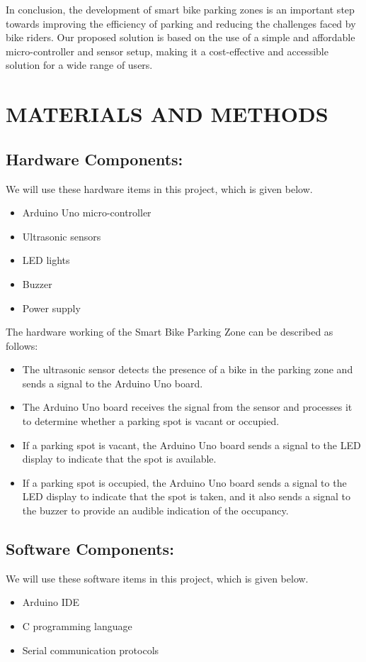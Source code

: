 \documentclass[conference]{IEEEtran}
\begin{document}
	In conclusion, the development of smart bike parking zones is an important step towards improving the efficiency of parking and reducing the challenges faced by bike riders. Our proposed solution is based on the use of a simple and affordable micro-controller and sensor setup, making it a cost-effective and accessible solution for a wide range of users.
	
	\section{MATERIALS AND METHODS}
	

	\subsection{Hardware Components:}
	 We will use these hardware items in this project, which is given below.
	
	\begin{itemize}
	\item Arduino Uno micro-controller
	\item Ultrasonic sensors
	\item LED lights
	\item Buzzer
	\item Power supply
	\end{itemize}
The hardware working of the Smart Bike Parking Zone can be described as follows:
	\begin{itemize}
	\item The ultrasonic sensor detects the presence of a bike in the parking zone and sends a signal to the Arduino Uno board.
	\item The Arduino Uno board receives the signal from the sensor and processes it to determine whether a parking spot is vacant or occupied.
	\item If a parking spot is vacant, the Arduino Uno board sends a signal to the LED display to indicate that the spot is available.
	\item If a parking spot is occupied, the Arduino Uno board sends a signal to the LED display to indicate that the spot is taken, and it also sends a signal to the buzzer to provide an audible indication of the occupancy.
\end{itemize}


	\subsection{Software Components:}
	 We will use these software items in this project, which is given below.	
	\begin{itemize}
		\item Arduino IDE
		\item C programming language
		\item Serial communication protocols
	\end{itemize}
\end{document}
